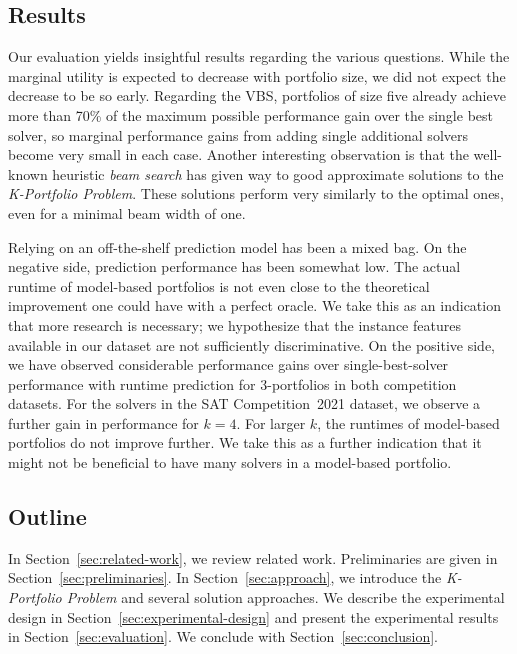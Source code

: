 \documentclass[a4paper,USenglish,pdfa]{lipics-v2021} %
\begin{document}
\subsection{Results}

Our evaluation yields insightful results regarding the various questions. 
While the marginal utility is expected to decrease with portfolio size, we did not expect the decrease to be so early. 
Regarding the VBS, portfolios of size five already achieve more than 70\% of the maximum possible performance gain over the single best solver, so marginal performance gains from adding single additional solvers become very small in each case. 
Another interesting observation is that the well-known heuristic \emph{beam search} has given way to good approximate solutions to the \emph{K-Portfolio Problem}. 
These solutions perform very similarly to the optimal ones, even for a minimal beam width of one.

Relying on an off-the-shelf prediction model has been a mixed bag. 
On the negative side, prediction performance has been somewhat low. 
The actual runtime of model-based portfolios is not even close to the theoretical improvement one could have with a perfect oracle.
We take this as an indication that more research is necessary; we hypothesize that the instance features available in our dataset are not sufficiently discriminative. 
On the positive side, we have observed considerable performance gains over single-best-solver performance with runtime prediction for $3$-portfolios in both competition datasets. 
For the solvers in the SAT Competition~2021 dataset, we observe a further gain in performance for $k = 4$. 
For larger $k$, the runtimes of model-based portfolios do not improve further. 
We take this as a further indication that it might not be beneficial to have many solvers in a model-based portfolio. 

\subsection{Outline}

In Section~\ref{sec:related-work}, we review related work. 
Preliminaries are given in Section~\ref{sec:preliminaries}. 
In Section~\ref{sec:approach}, we introduce the \emph{K-Portfolio Problem} and several solution approaches. 
We describe the experimental design in Section~\ref{sec:experimental-design} and present the experimental results in Section~\ref{sec:evaluation}. 
We conclude with Section~\ref{sec:conclusion}. 
\end{document}
